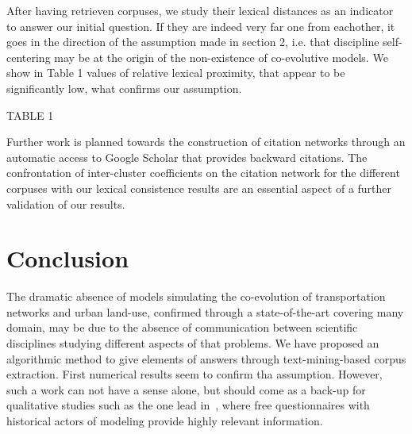 After having retrieven corpuses, we study their lexical distances as an indicator to answer our initial question. If they are indeed very far one from eachother, it goes in the direction of the assumption made in section 2, i.e. that discipline self-centering may be at the origin of the non-existence of co-evolutive models. We show in Table 1 values of relative lexical proximity, that appear to be significantly low, what confirms our assumption.


TABLE 1


Further work is planned towards the construction of citation networks through an automatic access to Google Scholar that provides backward citations. The confrontation of inter-cluster coefficients on the citation network for the different corpuses with our lexical consistence results are an essential aspect of a further validation of our results.



\section{Conclusion}

The dramatic absence of models simulating the co-evolution of transportation networks and urban land-use, confirmed through a state-of-the-art covering many domain, may be due to the absence of communication between scientific disciplines studying different aspects of that problems. We have proposed an algorithmic method to give elements of answers through text-mining-based corpus extraction. First numerical results seem to confirm tha assumption. However, such a work can not have a sense alone, but should come as a back-up for qualitative studies such as the one lead in~\cite{commenges:tel-00923682}, where free questionnaires with historical actors of modeling provide highly relevant information.



\small







